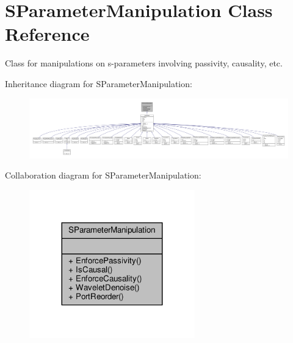 \hypertarget{classSignalIntegrity_1_1SParameters_1_1SParameterManipulation_1_1SParameterManipulation}{}\section{S\+Parameter\+Manipulation Class Reference}
\label{classSignalIntegrity_1_1SParameters_1_1SParameterManipulation_1_1SParameterManipulation}


Class for manipulations on s-\/parameters involving passivity, causality, etc.  




Inheritance diagram for S\+Parameter\+Manipulation\+:\nopagebreak
\begin{figure}[H]
\begin{center}
\leavevmode
\includegraphics[width=350pt]{classSignalIntegrity_1_1SParameters_1_1SParameterManipulation_1_1SParameterManipulation__inherit__graph}
\end{center}
\end{figure}


Collaboration diagram for S\+Parameter\+Manipulation\+:\nopagebreak
\begin{figure}[H]
\begin{center}
\leavevmode
\includegraphics[width=203pt]{classSignalIntegrity_1_1SParameters_1_1SParameterManipulation_1_1SParameterManipulation__coll__graph}
\end{center}
\end{figure}
